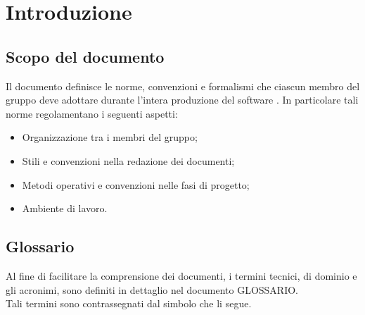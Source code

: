 \section{Introduzione}

\subsection{Scopo del documento}
Il documento definisce le norme, convenzioni e formalismi  che ciascun membro del gruppo \gruppo{} deve adottare durante l'intera produzione del software \progetto{}.
In particolare tali norme regolamentano i seguenti aspetti:

\begin{itemize}
\item Organizzazione tra i membri del gruppo;
\item Stili e convenzioni nella redazione dei documenti;
\item Metodi operativi e convenzioni nelle fasi di progetto;
\item Ambiente di lavoro.
\end{itemize}

\subsection{Glossario}
Al fine di facilitare la comprensione dei documenti, i termini tecnici, di dominio e gli acronimi, sono definiti in dettaglio nel documento GLOSSARIO.\\
Tali termini sono contrassegnati dal simbolo  che li segue.